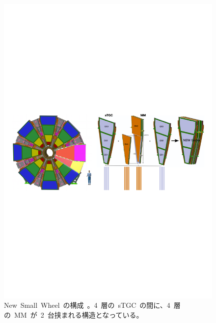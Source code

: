 \begin{figure}[H]
        \centering   
        \includegraphics[width=\textwidth,page=1]{img/pdf/nsw.pdf}
        \caption[New~Small~Wheel~の構成]{New~Small~Wheel~の構成~\cite{AR:14}。4~層の~sTGC~の間に、4~層の~MM~が~2~台挟まれる構造となっている。}
        \label{fig:nsw}
\end{figure}

